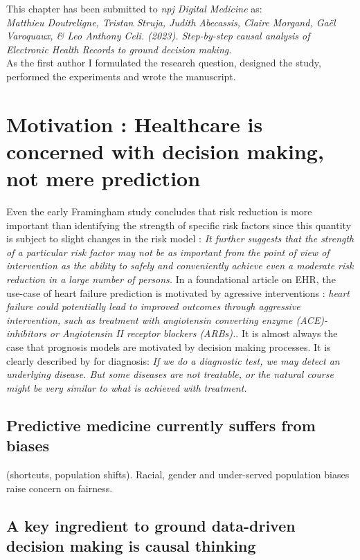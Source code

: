 \documentclass{report}
\begin{document}
\vfill
This chapter has been submitted to \textit{npj Digital Medicine} as:\\
\textit{Matthieu Doutreligne, Tristan Struja, Judith Abecassis, Claire Morgand, Gaël
Varoquaux, \& Leo Anthony Celi. (2023). Step-by-step causal analysis of Electronic Health Records to ground
decision making.} \\
As the first author I formulated the research question, designed the study,
performed the experiments and wrote the manuscript.

\clearpage
\section{Motivation : Healthcare is concerned with decision making, not mere
  prediction}%
\label{sec:causal_tuto:motivation}%


Even the early Framingham study concludes that risk reduction is more important
than identifying the strength of specific risk factors since this quantity is
subject to slight changes in the risk model \citep{brand1976multivariate}:
\textit{It further suggests that the strength of a particular risk factor may
  not be as important from the point of view of intervention as the ability to
  safely and conveniently achieve even a moderate risk reduction in a large number
  of persons.}
In a foundational article on EHR, the use-case of heart failure prediction is
motivated by agressive interventions \citep{wu2010prediction}: \textit{heart
  failure could potentially lead to improved outcomes through aggressive
  intervention, such as treatment with angiotensin converting enzyme
  (ACE)-inhibitors or Angiotensin II receptor blockers (ARBs).}. It is almost
always the case that prognosis models are motivated by decision making
processes. It is clearly described by \cite{steyerberg2009applications} for
diagnosis: \textit{If we do a diagnostic test, we may detect an underlying
  disease. But some diseases are not treatable, or the natural course might be
  very similar to what is achieved with treatment.}

\subsection{Predictive medicine currently suffers from biases}%
\label{subsec:causal_tuto:predictive_medicine_biases}%
(shortcuts,
population shifts). Racial, gender and under-served population biases raise
concern on fairness.

\subsection{A key ingredient to ground data-driven decision making is causal thinking}\label{subsec:causal_tuto:causal_thinking}
\end{document}
